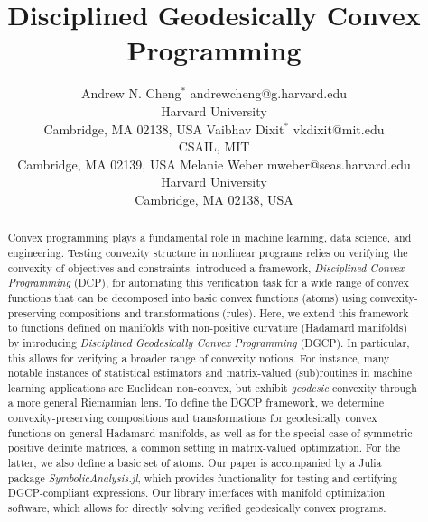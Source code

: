 \documentclass[twoside,11pt]{article}
\begin{document}
\title{Disciplined Geodesically Convex Programming}

\author{\name Andrew N. Cheng$^*$ {\email andrewcheng@g.harvard.edu \\
       \addr Harvard University\\
       Cambridge, MA 02138, USA}
       \AND
       \name Vaibhav Dixit$^*$ {\email vkdixit@mit.edu \\
       \addr CSAIL, MIT\\
       Cambridge, MA 02139, USA}
       \AND
       \name Melanie Weber \email mweber@seas.harvard.edu \\
       \addr Harvard University\\
       Cambridge, MA 02138, USA
       }


\maketitle
\def\thefootnote{*}

\begin{abstract}%
Convex programming plays a fundamental role in machine learning, data science, and engineering. Testing convexity structure in nonlinear programs relies on verifying the convexity of objectives and constraints. \citet{grant2006disciplined} introduced a framework, \emph{Disciplined Convex Programming} (DCP), for automating this verification task for a wide range of convex functions that can be decomposed into basic convex functions (atoms) using convexity-preserving compositions and transformations (rules).
Here, we extend this framework to functions defined on manifolds with non-positive curvature (Hadamard manifolds) by introducing \emph{Disciplined Geodesically Convex Programming} (DGCP). In particular, this allows for verifying a broader range of convexity notions. For instance, many notable instances of statistical estimators and matrix-valued (sub)routines in machine learning applications are Euclidean non-convex, but exhibit \emph{geodesic} convexity through a more general Riemannian lens. To define the DGCP framework, we determine convexity-preserving compositions and transformations for geodesically convex functions on general Hadamard manifolds, as well as for the special case of symmetric positive definite matrices, a common setting in matrix-valued optimization. For the latter, we also define a basic set of atoms. Our paper is accompanied by a Julia package \textsl{SymbolicAnalysis.jl}, which provides functionality for testing and certifying DGCP-compliant expressions. Our library interfaces with manifold optimization software, which allows for directly solving verified geodesically convex programs.
\end{abstract}
\end{document}
